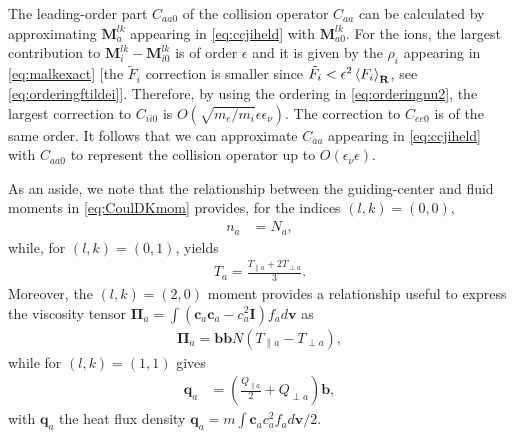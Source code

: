 {{The leading-order part $C_{aa0}$ of the collision operator $C_{aa}$ can be calculated by approximating $\mathbf M_{a}^{lk}$ appearing in \cref{eq:ccjiheld} with $\mathbf M_{a0}^{lk}$.
For the ions, the largest contribution to $\mathbf M_{i}^{lk}-\mathbf M_{i0}^{lk}$ is of order $\epsilon$ and it is given by the $\rho_i$ appearing in \cref{eq:malkexact} [the $\tilde F_i$ correction is smaller since $\tilde F_i < \epsilon^2 \left< F_i \right>_{\mathbf R}$, see \cref{eq:orderingftildei}]. Therefore, by using the ordering in \cref{eq:orderingnu2}, the largest correction to $C_{ii0}$ is $O(\sqrt{m_e/m_i} \epsilon \epsilon_\nu)$. The correction to $C_{ee0}$ is of the same order. It follows that we can approximate $C_{aa}$ appearing in \cref{eq:ccjiheld} with $C_{aa0}$ to represent the collision operator up to $O(\epsilon_{\nu} \epsilon)$.

As an aside, we note that the relationship between the guiding-center and fluid moments in \cref{eq:CoulDKmom} provides, for the indices $(l,k)=(0,0)$,
%
\begin{align}
    n_a &= N_a,
\end{align}
%
while, for $(l,k)=(0,1)$, yields
%
\begin{align}
    T_a = \frac{T_{\parallel a}+2 T_{\perp a}}{3}.
\end{align}
%
Moreover, the $(l,k)=(2,0)$ moment provides a relationship useful to express the viscosity tensor $\mathbf \Pi_a = \int (\mathbf c_a \mathbf c_a - c_a^2 \mathbf I) f_a d\mathbf v$ as
%
\begin{align}
    \mathbf \Pi_a = \mathbf b \mathbf b N (T_{\parallel a} - T_{\perp a}),
\label{eq:stressdk}
\end{align}
%
while for $(l,k)=(1,1)$ gives
%
\begin{align}
    \mathbf q_a &= \left(\frac{Q_{\parallel a}}{2}+Q_{\perp a}\right)\mathbf b,
\label{eq:heatfluxdk}
\end{align}
%
with $\mathbf q_a$ the heat flux density $\mathbf q_a = m \int \mathbf c_a c_a^2 f_a d \mathbf v/2$.

}}
